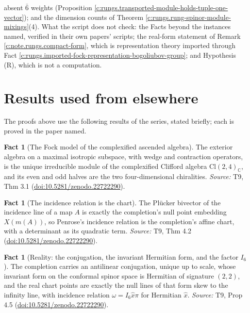 \documentclass[11pt]{article}
\theoremstyle{definition}
\newtheorem{fact}[theorem]{Fact}
\theoremstyle{plain}
\providecommand{\C}{}\renewcommand{\C}{\mathbb{C}}
\providecommand{\Cl}{}\renewcommand{\Cl}{\mathrm{Cl}}
\begin{document}
absent $\bar{6}$ weights (Proposition \ref{c:rungs.transported-module-holds-tuple-one-vector}); and the dimension counts of Theorem \ref{c:rungs.rung-spinor-module-mixings}(4). What the script does not check: the Facts beyond the instances named, verified in their own papers' scripts; the real-form statement of Remark \ref{c:note.rungs.compact-form}, which is representation theory imported through Fact \ref{c:rungs.imported-fock-representation-bogoliubov-group}; and Hypothesis (R), which is not a computation.

\section{Results used from elsewhere}
The proofs above use the following results of the series, stated briefly; each is proved in the paper named.

\begin{fact}[The Fock model of the complexified ascended algebra]\label{c:correspondence.fock-model-complexified-ascended-algebra}
The exterior algebra on a maximal isotropic subspace, with wedge and contraction operators, is the unique irreducible module of the complexified Clifford algebra $\Cl(2,4)_\C$, and its even and odd halves are the two four-dimensional chiralities.
\emph{Source:} T9, Thm 3.1 (\href{https://doi.org/10.5281/zenodo.22722290}{doi:10.5281/zenodo.22722290}).
\end{fact}

\begin{fact}[The incidence relation is the chart]\label{c:correspondence.incidence-relation-chart}
The Pl\"ucker bivector of the incidence line of a map $A$ is exactly the completion's null point embedding $X(m(A))$, so Penrose's incidence relation is the completion's affine chart, with a determinant as its quadratic term.
\emph{Source:} T9, Thm 4.2 (\href{https://doi.org/10.5281/zenodo.22722290}{doi:10.5281/zenodo.22722290}).
\end{fact}

\begin{fact}[Reality: the conjugation, the invariant Hermitian form, and the factor $I_6$]\label{c:correspondence.reality-conjugation-twistor-form-factor}
The completion carries an antilinear conjugation, unique up to scale, whose invariant form on the conformal spinor space is Hermitian of signature $(2,2)$, and the real chart points are exactly the null lines of that form skew to the infinity line, with incidence relation $\omega = I_6\hat x\pi$ for Hermitian $\hat x$.
\emph{Source:} T9, Prop 4.5 (\href{https://doi.org/10.5281/zenodo.22722290}{doi:10.5281/zenodo.22722290}).
\end{fact}
\end{document}
